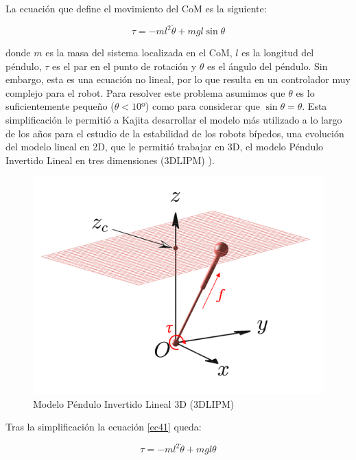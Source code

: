 La ecuación que define el movimiento del CoM es la siguiente:

\begin{equation}
\tau = - ml^2\ddot{\theta}+mgl\sin\theta
\label{ec41}
\end{equation}

donde $m$ es la masa del sistema localizada en el CoM, $l$ es la longitud del péndulo, $\tau$ es el par en el punto de rotación y $\theta$ es el ángulo del péndulo. Sin embargo, esta es una ecuación no lineal, por lo que resulta en un controlador muy complejo para el robot. Para resolver este problema asumimos que $\theta$ es lo suficientemente pequeño ($\theta<10º$) como para considerar que $\sin\theta=\theta$. Esta simplificación le permitió a Kajita desarrollar el modelo más utilizado a lo largo de los años para el estudio de la estabilidad de los robots bípedos, una evolución del modelo lineal en 2D, que le permitió trabajar en 3D, el modelo Péndulo Invertido Lineal en tres dimensiones (3DLIPM)
)\cite{ref15}.

\begin{figure}[H]
\centering
\includegraphics[scale=0.5]{imagenes/apartado_4/43_3D_linear_inverted_pendulum_model}
\caption{Modelo Péndulo Invertido Lineal 3D (3DLIPM)}
\label{figura43}
\end{figure}

Tras la simplificación la ecuación \ref{ec41} queda:

\begin{equation}
\tau = - ml^2\ddot{\theta}+mgl\theta
\label{ec42}
\end{equation}

